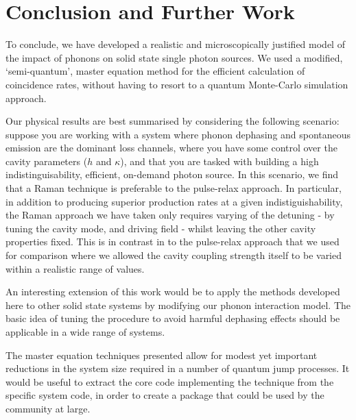 \section{Conclusion and Further Work}

To conclude, we have developed a realistic and microscopically justified model of the impact of phonons on solid state single photon sources. We used a modified, `semi-quantum', master equation method for the efficient calculation of coincidence rates, without having to resort to a quantum Monte-Carlo simulation approach.

Our physical results are best summarised by considering the following scenario: suppose you are working with a system where phonon dephasing and spontaneous emission are the dominant loss channels, where you have some control over the cavity parameters ($h$ and $\kappa$), and that you are tasked with building a high indistinguisability, efficient, on-demand photon source. In this scenario, we find that a Raman technique is preferable to the pulse-relax approach. In particular, in addition to producing superior production rates at a given indistiguishability, the Raman approach we have taken only requires varying of the detuning - by tuning the cavity mode, and driving field - whilst leaving the other cavity properties fixed. This is in contrast in to the pulse-relax approach that we used for comparison where we allowed the cavity coupling strength itself to be varied within a realistic range of values. 

An interesting extension of this work would be to apply the methods developed here to other solid state systems by modifying our phonon interaction model. The basic idea of tuning the procedure to avoid harmful dephasing effects should be applicable in a wide range of systems.

The master equation techniques presented allow for modest yet important reductions in the system size required in a number of quantum jump processes. It would be useful to extract the core code implementing the technique from the specific system code, in order to create a package that could be used by the community at large. 
